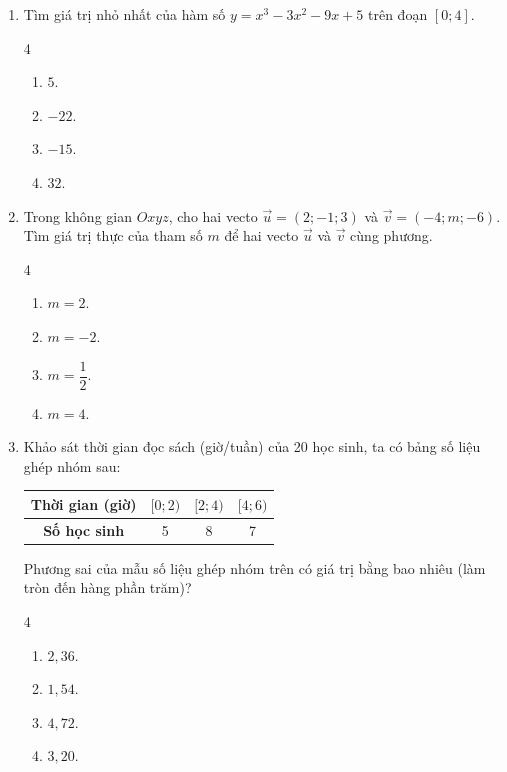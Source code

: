 \documentclass[12pt]{article}
\begin{document}
\begin{enumerate}[label=\textbf{Câu \arabic*.}, leftmargin=*]
		\item Tìm giá trị nhỏ nhất của hàm số $y = x^3 - 3x^2 - 9x + 5$ trên đoạn $[0; 4]$.
		\begin{multicols}{4}
			\begin{enumerate}[label=\Alph*.]
				\item $5$.
				\item $-22$.
				\item $-15$.
				\item $32$.
			\end{enumerate}
		\end{multicols}
		
		\item Trong không gian $Oxyz$, cho hai vecto $\vec{u} = (2; -1; 3)$ và $\vec{v} = (-4; m; -6)$. Tìm giá trị thực của tham số $m$ để hai vecto $\vec{u}$ và $\vec{v}$ cùng phương.
		\begin{multicols}{4}
			\begin{enumerate}[label=\Alph*.]
				\item $m = 2$.
				\item $m = -2$.
				\item $m = \dfrac{1}{2}$.
				\item $m = 4$.
			\end{enumerate}
		\end{multicols}
		
		\item Khảo sát thời gian đọc sách (giờ/tuần) của 20 học sinh, ta có bảng số liệu ghép nhóm sau:
		\begin{center}
			\begin{tabular}{|c|c|c|c|}
				\hline
				\textbf{Thời gian (giờ)} & $[0; 2)$ & $[2; 4)$ & $[4; 6)$ \\
				\hline
				\textbf{Số học sinh} & 5 & 8 & 7 \\
				\hline
			\end{tabular}
		\end{center}
		Phương sai của mẫu số liệu ghép nhóm trên có giá trị bằng bao nhiêu (làm tròn đến hàng phần trăm)?
		\begin{multicols}{4}
			\begin{enumerate}[label=\Alph*.]
				\item $2,36$.
				\item $1,54$.
				\item $4,72$.
				\item $3,20$.
			\end{enumerate}
		\end{multicols}
		

\end{enumerate}
\end{document}
